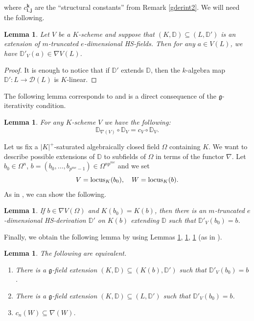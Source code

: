\documentclass[10pt]{amsart}
\newtheorem{lemma}[theorem]{Lemma}
\theoremstyle{definition}
\begin{document}
where $c_{\mathbf{i},\mathbf{j}}^{\mathbf{k}}$ are the ``structural constants'' from Remark \ref{gderint2}.
We will need the following.
\begin{lemma}\label{nablaL}
Let $V$ be a $K$-scheme and suppose that $(K,\mathbb{D})\subseteq(L,\mathbb{D}')$ is an extension of $m$-truncated $e$-dimensional HS-fields. Then for any $a\in V(L)$, we have
 $\mathbb{D}'_V(a)\in\nabla V(L)$.
\end{lemma}
\begin{proof}
It is enough to notice that if $\mathbb{D}'$ extends $\mathbb{D}$, then the $k$-algebra map $\mathbb{D}':L\to \mathcal{D}(L)$ is $K$-linear.
\end{proof}
\noindent
The following lemma corresponds to \cite[Lemma 1.1(ii)]{K3} and is a direct consequence of the $\mathfrak{g}$-iterativity condition.
\begin{lemma}\label{gitnabla}
For any $K$-scheme $V$ we have the following:
$$\mathbb{D}_{\nabla(V)}\circ \mathbb{D}_V=c_V\circ \mathbb{D}_V.$$
\end{lemma}
\noindent
Let us fix a $|K|^+$-saturated algebraically closed field $\Omega$ containing $K$. We want to describe possible extensions of $\mathbb{D}$ to subfields of $\Omega$ in terms of the functor $\nabla$. Let $b_0\in\Omega^n$, $b=(b_0,\ldots,b_{p^{me}-1})\in\Omega^{np^{me}}$ and we set
$$V=\locus_K(b_0),\ \ \ W=\locus_K(b).$$
As in \cite[Lemma 3.3]{K3}, we can show the following.
\begin{lemma}\label{nablaext}
If $b\in \nabla V(\Omega)$ and $K(b_0)=K(b)$, then there is an $m$-truncated $e$-dimensional HS-derivation $\mathbb{D}'$ on $K(b)$ extending $\mathbb{D}$ such that $\mathbb{D}'_V(b_0)=b$.
\end{lemma}
\noindent
Finally, we obtain the following lemma by using Lemmas \ref{nablaL}, \ref{gitnabla}, \ref{nablaext} (as in \cite{K3}).
\begin{lemma}\label{cVW}
The following are equivalent.
\begin{enumerate}
\item  There is a $\mathfrak{g}$-field extension $(K,\mathbb{D})\subseteq(K(b),\mathbb{D}')$ such that $\mathbb{D}'_V(b_0)=b$.

\item  There is a $\mathfrak{g}$-field extension $(K,\mathbb{D})\subseteq(L,\mathbb{D}')$ such that $\mathbb{D}'_V(b_0)=b$.

\item $c_{n}(W)\subseteq \nabla(W)$.
\end{enumerate}
\end{lemma}
\end{document}
